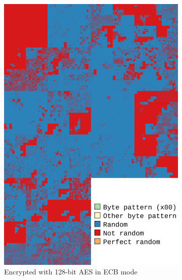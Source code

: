\documentclass[
  digital, %
  color,   %
  oneside, %
  lof,     %
  nolot,     %
]{fithesis4}
\begin{document}
\begin{figure}
\begin{subfigure}[t]{.32\textwidth}
        \includegraphics[width=\textwidth,interpolate=false]{ubnt-test-aes-128-ecb-chi2-4-hilbert-legend.png}
        \caption{Encrypted with 128-bit AES in ECB mode}
        \label{fig:bad-enc-enc}
    \end{subfigure}
    \hfill
    \begin{subfigure}[t]{.32\textwidth}
        \centering

\end{subfigure}
\end{figure}
\end{document}
